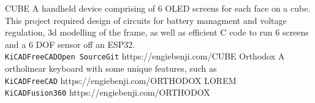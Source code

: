 \documentclass[9pt]{developercv} %
\begin{document}
\vspace{0.5cm}


\begin{entrylist}
	\QRentry
		{CUBE}
		{A handheld device comprising of 6 OLED screens for each face on a cube. This project required design of circuits for battery managment and voltage regulation, 3d modelling of the frame, as well as efficient C code to run 6 screens and a 6 DOF sensor off an ESP32.\\ \texttt{KiCAD}\slashsep\texttt{FreeCAD}\slashsep\texttt{Open Source}\slashsep\texttt{Git}}
		{https://engiebenji.com/CUBE}
	\QRentry
		{Orthodox}
		{A ortholinear keyboard with some unique features, such as \\ \texttt{KiCAD}\slashsep\texttt{FreeCAD}}
		{https://engiebenji.com/ORTHODOX}
	\QRentry
		{LOREM}
		{\lorem\lorem\\ \texttt{KiCAD}\slashsep\texttt{Fusion360}}
		{https://engiebenji.com/ORTHODOX}
\end{entrylist}

\end{document}
